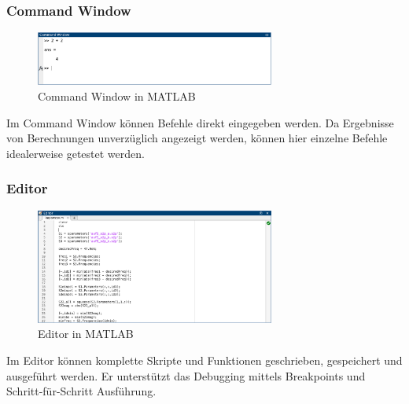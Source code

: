 \documentclass[12pt, a4paper, twoside]{article}
\begin{document}
            \subsubsection*{Command Window}
                \begin{figure}[H]
                    \centering
                    \includegraphics[width=0.7\textwidth]{Bilder/CommandWindow.png}
                    \caption{Command Window in MATLAB}
                \end{figure}
                Im Command Window können Befehle direkt eingegeben werden. Da Ergebnisse von Berechnungen unverzüglich angezeigt werden, können hier einzelne Befehle idealerweise getestet werden.
            \subsubsection*{Editor}
                \begin{figure}[H]
                    \centering
                    \includegraphics[width=0.7\textwidth]{Bilder/Editor.png}
                    \caption{Editor in MATLAB}
                \end{figure}
                Im Editor können komplette Skripte und Funktionen geschrieben, gespeichert und ausgeführt werden. Er unterstützt das Debugging mittels Breakpoints und Schritt-für-Schritt Ausführung.
\end{document}
